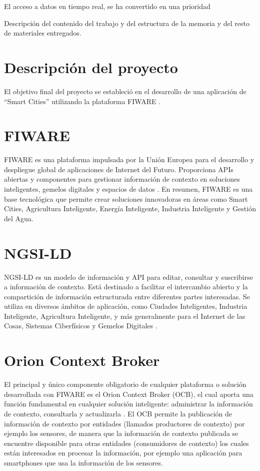 
El acceso a datos en tiempo real, se ha convertido en una prioridad 

Descripción del contenido del trabajo y del estructura de la memoria y del resto de materiales entregados.

\section{Descripción del proyecto}
El objetivo final del proyecto se estableció en el desarrollo de una aplicación de “Smart Cities” utilizando la plataforma FIWARE \cite{fiware2024}. 

\section{FIWARE}
FIWARE es una plataforma impulsada por la Unión Europea para el desarrollo y despliegue 
global de aplicaciones de Internet del Futuro. Proporciona APIs abiertas y componentes para 
gestionar información de contexto en soluciones inteligentes, gemelos digitales y espacios de 
datos \cite{fiware2024}. En resumen, FIWARE es una base tecnológica que permite crear soluciones 
innovadoras en áreas como Smart Cities, Agricultura Inteligente, Energía Inteligente, Industria 
Inteligente y Gestión del Agua. 

\section{NGSI-LD}
NGSI-LD es un modelo de información y API para editar, consultar y suscribirse a información 
de contexto. Está destinado a facilitar el intercambio abierto y la compartición de información 
estructurada entre diferentes partes interesadas. Se utiliza en diversos ámbitos de aplicación, 
como Ciudades Inteligentes, Industria Inteligente, Agricultura Inteligente, y más generalmente 
para el Internet de las Cosas, Sistemas Ciberfísicos y Gemelos Digitales \cite{etsi2024}.

\section{Orion Context Broker}
El principal y único componente obligatorio de cualquier plataforma o solución desarrollada con FIWARE es el Orion Context Broker (OCB), el cual aporta una función fundamental en cualquier solución inteligente: administrar la información de contexto, consultarla y actualizarla \cite{orion2024}. El OCB permite la publicación de información de contexto por entidades (llamados productores de contexto) por ejemplo los sensores, de manera que la información de contexto publicada se encuentre disponible para otras entidades (consumidores de contexto) los cuales están interesados en procesar la información, por ejemplo una aplicación para smartphones que usa la información de los sensores.

